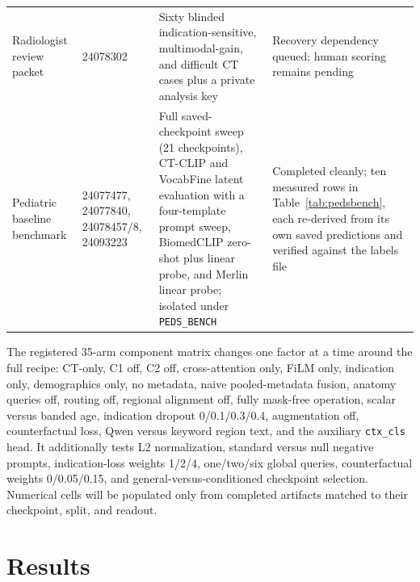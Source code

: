 \documentclass[10pt,twocolumn]{article}
\begin{document}
\begin{table}[t]
\begin{tabularx}{\textwidth}{@{}llXl@{}}
Radiologist review packet & 24078302 & Sixty blinded indication-sensitive, multimodal-gain, and difficult CT cases plus a private analysis key & Recovery dependency queued; human scoring remains pending \\
Pediatric baseline benchmark & 24077477, 24077840, 24078457/8, 24093223 & Full saved-checkpoint sweep (21 checkpoints), CT-CLIP and VocabFine latent evaluation with a four-template prompt sweep, BiomedCLIP zero-shot plus linear probe, and Merlin linear probe; isolated under \texttt{PEDS\_BENCH} & Completed cleanly; ten measured rows in Table~\ref{tab:pedsbench}, each re-derived from its own saved predictions and verified against the labels file \\
\bottomrule
\end{tabularx}
\end{table}

The registered 35-arm component matrix changes one factor at a time around the full
recipe: CT-only, C1 off, C2 off, cross-attention only, FiLM only, indication
only, demographics only, no metadata, naive pooled-metadata fusion, anatomy
queries off, routing off, regional alignment off, fully mask-free operation,
scalar versus banded age, indication dropout 0/0.1/0.3/0.4, augmentation off,
counterfactual loss, Qwen versus keyword region text, and the auxiliary
\texttt{ctx\_cls} head. It additionally tests L2 normalization, standard
versus null negative prompts, indication-loss weights 1/2/4, one/two/six global
queries, counterfactual weights 0/0.05/0.15, and general-versus-conditioned
checkpoint selection. Numerical cells will be populated only from completed
artifacts matched to their checkpoint, split, and readout.

\section{Results}
\end{document}
